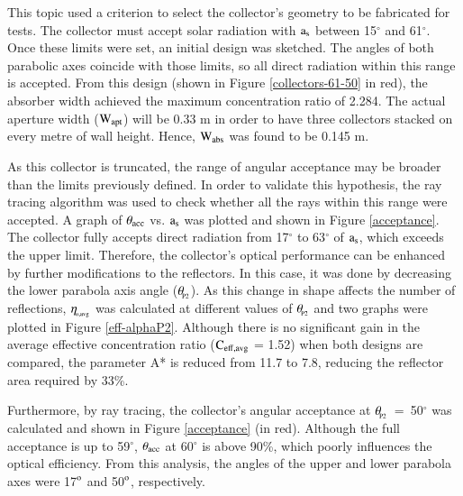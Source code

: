 This topic used a criterion to select the collector's geometry to be fabricated for tests. The collector must accept solar radiation with $\rm{a_s}$ between 15$^{\circ}$ and 61$^{\circ}$. Once these limits were set, an initial design was sketched. The angles of both parabolic axes coincide with those limits, so all direct radiation within this range is accepted. From this design (shown in Figure \ref{collectors-61-50} in red), the absorber width achieved the maximum concentration ratio of 2.284. The actual aperture width ($\rm{W_{apt}}$) will be 0.33 m in order to have three collectors stacked on every metre of wall height. Hence, $\rm{W_{abs}}$ was found to be 0.145 m.


As this collector is truncated, the range of angular acceptance may be broader than the limits previously defined. In order to validate this hypothesis, the ray tracing algorithm was used to check whether all the rays within this range were accepted. A graph of $\theta_{\rm{acc}}$ vs. ${\rm{a_s}}$ was plotted and shown in Figure \ref{acceptance}. The collector fully accepts direct radiation from 17$^{\circ}$ to 63$^{\circ}$ of ${\rm{a_s}}$, which exceeds the upper limit. Therefore, the collector's optical performance can be enhanced by further modifications to the reflectors. In this case, it was done by decreasing the lower parabola axis angle ($\theta_{\!_{\rm{P2}}}$). As this change in shape affects the number of reflections, $\rm{\eta_{\!_{o,avg}}}$ was calculated at different values of $\theta_{\!_{\rm{P2}}}$ and two graphs were plotted in Figure \ref{eff-alphaP2}. Although there is no significant gain in the average effective concentration ratio ($\rm{C_{eff,avg}}$ = 1.52) when both designs are compared, the parameter A* is reduced from 11.7 to 7.8, reducing the reflector area required by 33\%.


Furthermore, by ray tracing, the collector's angular acceptance at \mbox{$\theta_{\!_{\rm{P2}}}$ = 50$^{\circ}$} was calculated and shown in Figure \ref{acceptance} (in red). Although the full acceptance is up to 59$^{\circ}$, $\rm{\theta_{acc}}$ at 60$^{\circ}$ is above 90\%, which poorly influences the optical efficiency. From this analysis, the angles of the upper and lower parabola axes were 17$^{\rm o}$ and 50$^{\rm o}$, respectively. 

